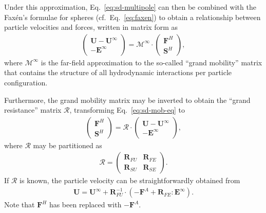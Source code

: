Under this approximation, Eq.\ \eqref{eq:sd-multipole} can then be combined with the Fax\'{e}n's formulae for spheres (cf.\ Eq.\ \ref{eq:faxen}) to obtain a relationship between particle velocities and forces, written in matrix form as
\begin{equation} \label{eq:sd-mob-eq}
 \begin{aligned} 
  \begin{pmatrix}
   {\bm U}-{\bm U}^\infty \\
   -{\bm E}^\infty
  \end{pmatrix}
  = \mathscr{M^\infty} \cdot
  \begin{pmatrix}
   {\bm F}^H \\
   {\bm S}^H
  \end{pmatrix},
 \end{aligned}
\end{equation}
where $\mathscr{M}^\infty$ is the far-field approximation to the so-called ``grand mobility'' matrix that contains the structure of all hydrodynamic interactions per particle configuration.

Furthermore, the grand mobility matrix may be inverted to obtain the ``grand resistance'' matrix $\mathscr{R}$, transforming Eq.\ \eqref{eq:sd-mob-eq} to
\begin{equation} 
 \begin{aligned} \label{eq:sd-hydro}
  \begin{pmatrix}
   {\bm F}^H \\
   {\bm S}^H
  \end{pmatrix}
  = \mathscr{R} \cdot
  \begin{pmatrix}
   {\bm U}-{\bm U}^\infty \\
   -{\bm E}^\infty
  \end{pmatrix},
 \end{aligned}
\end{equation}
where $\mathscr{R}$ may be partitioned as
\begin{equation} 
 \begin{aligned}
  \mathscr{R} =
  \begin{pmatrix}
   {\bm R}_{FU} & {\bm R}_{FE} \\
   {\bm R}_{SU} & {\bm R}_{SE}
  \end{pmatrix}.
 \end{aligned}
\end{equation} 
If $\mathscr{R}$ is known, the particle velocity can be straightforwardly obtained from
\begin{equation} \label{eq:sd-vel}
 \begin{aligned}
  \bm{U} =  \bm{U}^\infty + \bm{R}_{FU}^{-1} \cdot(-\bm{F}^A +\bm{R}_{FE}:\bm{E}^\infty).
 \end{aligned}
\end{equation}
Note that $\bm{F}^H$ has been replaced with $-\bm{F}^A$.

